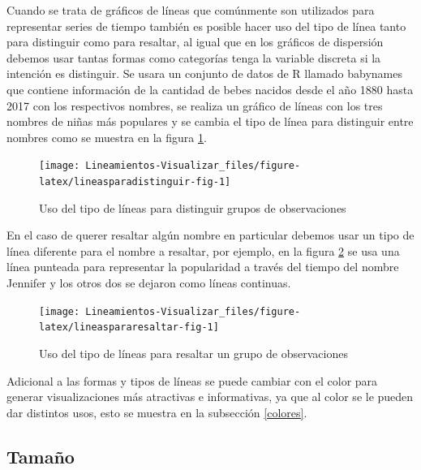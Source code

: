 \documentclass[
]{book}
\begin{document}
Cuando se trata de gráficos de líneas que comúnmente son utilizados para representar series de tiempo también es posible hacer uso del tipo de línea tanto para distinguir como para resaltar, al igual que en los gráficos de dispersión debemos usar tantas formas como categorías tenga la variable discreta si la intención es distinguir. Se usara un conjunto de datos de R llamado babynames que contiene información de la cantidad de bebes nacidos desde el año 1880 hasta 2017 con los respectivos nombres, se realiza un gráfico de líneas con los tres nombres de niñas más populares y se cambia el tipo de línea para distinguir entre nombres como se muestra en la figura \ref{fig:lineasparadistinguir-fig}.

\begin{figure}

{\centering \texttt{[image: Lineamientos-Visualizar\_files/figure-latex/lineasparadistinguir-fig-1]} 

}

\caption{Uso del tipo de líneas para distinguir grupos de observaciones}\label{fig:lineasparadistinguir-fig}
\end{figure}

En el caso de querer resaltar algún nombre en particular debemos usar un tipo de línea diferente para el nombre a resaltar, por ejemplo, en la figura \ref{fig:lineaspararesaltar-fig} se usa una línea punteada para representar la popularidad a través del tiempo del nombre Jennifer y los otros dos se dejaron como líneas continuas.

\begin{figure}

{\centering \texttt{[image: Lineamientos-Visualizar\_files/figure-latex/lineaspararesaltar-fig-1]} 

}

\caption{Uso del tipo de líneas para resaltar un grupo de observaciones}\label{fig:lineaspararesaltar-fig}
\end{figure}

Adicional a las formas y tipos de líneas se puede cambiar con el color para generar visualizaciones más atractivas e informativas, ya que al color se le pueden dar distintos usos, esto se muestra en la subsección \ref{colores}.

\hypertarget{tamauxf1o}{%
\subsection{Tamaño}\label{tamauxf1o}}
\end{document}

